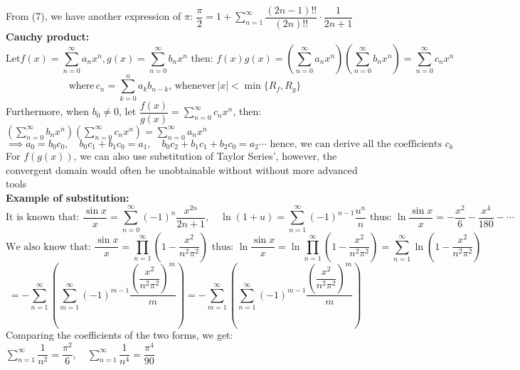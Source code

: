 \documentclass{article}
\newcommand{\infsum}{\sum\limits_{n=1}^\infty}
\newcommand{\infprod}{\prod\limits_{n=1}^\infty}
\newcommand{\0}{{\bf{0}}}
\begin{document}
From (7), we have another expression of $\pi:\,\dfrac{\pi}{2}=1+\infsum\dfrac{(2n-1)!!}{(2n)!!}\cdot\dfrac{1}{2n+1}$\\
\textbf{Cauchy product:}
$$\mbox{Let} f(x)=\sum_{n=0}^\infty a_nx^n,g(x)=\sum_{n=0}^\infty b_nx^n\mbox{ then: }f(x)g(x)=\left(\sum_{n=0}^\infty a_nx^n\right)\left(\sum_{n=0}^\infty b_nx^n\right)=\sum_{n=0}^\infty c_nx^n$$
$$\mbox{where}\,c_n=\sum_{k=0}^n a_kb_{n-k}\mbox{, whenever}\,|x|<\min\{R_f,R_g\}$$
Furthermore, when $b_0\neq0$, let $\dfrac{f(x)}{g(x)}=\sum\limits_{n=0}^\infty c_nx^n$, then: $\left(\sum\limits_{n=0}^\infty b_nx^n\right)\left(\sum\limits_{n=0}^\infty c_nx^n\right)=\sum\limits_{n=0}^\infty a_nx^n$
$$\implies a_0=b_0c_0,\quad b_0c_1+b_1c_0=a_1,\quad b_0c_2+b_1c_1+b_2c_0=a_2\cdots\mbox{ hence, we can derive all the coefficients $c_k$}$$
For $f(g(x))$, we can also use substitution of Taylor Series', however, the convergent domain would often be unobtainable without without more advanced tools\\
\textbf{Example of substitution:}
$$\mbox{It is known that: }\frac{\sin x}{x}=\sum_{n=0}^\infty(-1)^n\frac{x^{2n}}{2n+1},\quad\ln(1+u)=\infsum(-1)^{n-1}\frac{u^n}{n}\mbox{ thus: }\ln\frac{\sin x}{x}=-\frac{x^2}{6}-\frac{x^4}{180}-\cdots$$
$$\mbox{We also know that: }\frac{\sin x}{x}=\infprod\left(1-\frac{x^2}{n^2\pi^2}\right)\mbox{ thus: }\ln\frac{\sin x}{x}=\ln\infprod\left(1-\frac{x^2}{n^2\pi^2}\right)=\infsum\ln\left(1-\frac{x^2}{n^2\pi^2}\right)$$
$$=-\infsum\left(\sum_{m=1}^\infty(-1)^{m-1}\dfrac{\left(\dfrac{x^2}{n^2\pi^2}\right)^m}{m}\right)=-\sum_{m=1}^\infty\left(\infsum(-1)^{m-1}\dfrac{\left(\dfrac{x^2}{n^2\pi^2}\right)^m}{m}\right)$$
Comparing the coefficients of the two forms, we get: $\infsum\dfrac{1}{n^2}=\dfrac{\pi^2}{6},\quad\infsum\dfrac{1}{n^4}=\dfrac{\pi^4}{90}$
\end{document}

